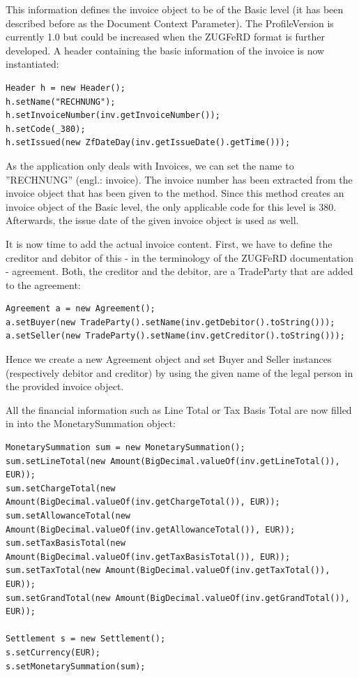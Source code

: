 This information defines the invoice object to be of the Basic level (it has been described before as the Document Context Parameter). The ProfileVersion is currently 1.0 but could be increased when the ZUGFeRD format is further developed.
A header containing the basic information of the invoice is now instantiated:

\begin{lstlisting}[caption={Populating header information}]
Header h = new Header();
h.setName("RECHNUNG");
h.setInvoiceNumber(inv.getInvoiceNumber());
h.setCode(_380);
h.setIssued(new ZfDateDay(inv.getIssueDate().getTime()));
\end{lstlisting}

As the application only deals with Invoices, we can set the name to ''RECHNUNG'' (engl.: invoice). The invoice number has been extracted from the invoice object that has been given to the method.
Since this method creates an invoice object of the Basic level, the only applicable code for this level is 380. Afterwards, the issue date of the given invoice object is used as well.

It is now time to add the actual invoice content. First, we have to define the creditor and debitor of this - in the terminology of the ZUGFeRD documentation - agreement. Both, the creditor and the debitor, are a TradeParty that are added to the agreement:

\begin{lstlisting}[caption={Creation of a new agreement}]
Agreement a = new Agreement();
a.setBuyer(new TradeParty().setName(inv.getDebitor().toString()));
a.setSeller(new TradeParty().setName(inv.getCreditor().toString()));
\end{lstlisting}

Hence we create a new Agreement object and set Buyer and Seller instances (respectively debitor and creditor) by using the given name of the legal person in the provided invoice object.

All the financial information such as Line Total or Tax Basis Total are now filled in into the MonetarySummation object:

\begin{lstlisting}[caption={Population of the MonetarySummation object}]
MonetarySummation sum = new MonetarySummation();
sum.setLineTotal(new Amount(BigDecimal.valueOf(inv.getLineTotal()), EUR));
sum.setChargeTotal(new Amount(BigDecimal.valueOf(inv.getChargeTotal()), EUR));
sum.setAllowanceTotal(new Amount(BigDecimal.valueOf(inv.getAllowanceTotal()), EUR));
sum.setTaxBasisTotal(new Amount(BigDecimal.valueOf(inv.getTaxBasisTotal()), EUR));
sum.setTaxTotal(new Amount(BigDecimal.valueOf(inv.getTaxTotal()), EUR));
sum.setGrandTotal(new Amount(BigDecimal.valueOf(inv.getGrandTotal()), EUR));

Settlement s = new Settlement();
s.setCurrency(EUR);
s.setMonetarySummation(sum);
\end{lstlisting}

